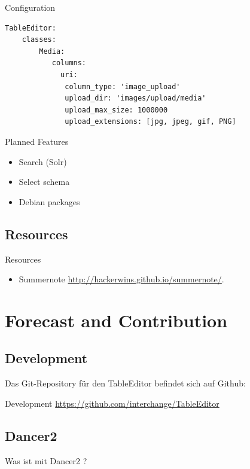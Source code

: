\begin{frame}[fragile]{Configuration}
\begin{lstlisting}
TableEditor:
    classes:
        Media:
           columns: 
             uri:
              column_type: 'image_upload'
              upload_dir: 'images/upload/media'
              upload_max_size: 1000000
              upload_extensions: [jpg, jpeg, gif, PNG]
\end{lstlisting}
\end{frame}

\begin{frame}{Planned Features}
\begin{itemize}
\item Search (Solr)
\item Select schema
\item Debian packages
\end{itemize}
\end{frame}

\subsection{Resources}

\begin{frame}{Resources}
\begin{itemize}
\item Summernote \url{http://hackerwins.github.io/summernote/}.
\end{itemize}
\end{frame}{}
\section{Forecast and Contribution}

\subsection{Development}

Das Git-Repository für den TableEditor befindet sich auf Github:

\begin{frame}{Development}
\url{https://github.com/interchange/TableEditor}
\end{frame}

\subsection{Dancer2}

Was ist mit Dancer2 ?


